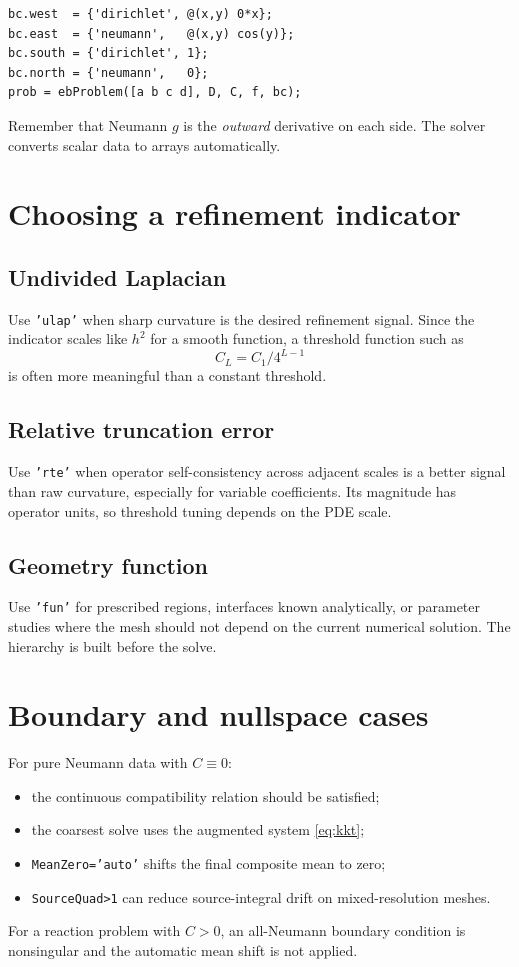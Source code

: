 \documentclass[11pt,oneside,openany]{book}
\newcommand{\code}[1]{\textnormal{\texttt{#1}}}
\begin{document}
\begin{lstlisting}[caption={Mixed physical boundary data.}]
bc.west  = {'dirichlet', @(x,y) 0*x};
bc.east  = {'neumann',   @(x,y) cos(y)};
bc.south = {'dirichlet', 1};
bc.north = {'neumann',   0};
prob = ebProblem([a b c d], D, C, f, bc);
\end{lstlisting}

Remember that Neumann $g$ is the \emph{outward} derivative on each side. The solver converts scalar data to arrays automatically.

\section{Choosing a refinement indicator}
\subsection{Undivided Laplacian}
Use \code{'ulap'} when sharp curvature is the desired refinement signal. Since the indicator scales like $h^2$ for a smooth function, a threshold function such as
\[
  C_L=C_1/4^{L-1}
\]
is often more meaningful than a constant threshold.

\subsection{Relative truncation error}
Use \code{'rte'} when operator self-consistency across adjacent scales is a better signal than raw curvature, especially for variable coefficients. Its magnitude has operator units, so threshold tuning depends on the PDE scale.

\subsection{Geometry function}
Use \code{'fun'} for prescribed regions, interfaces known analytically, or parameter studies where the mesh should not depend on the current numerical solution. The hierarchy is built before the solve.

\section{Boundary and nullspace cases}
For pure Neumann data with $C\equiv0$:
\begin{itemize}
\item the continuous compatibility relation should be satisfied;
\item the coarsest solve uses the augmented system \cref{eq:kkt};
\item \code{MeanZero='auto'} shifts the final composite mean to zero;
\item \code{SourceQuad>1} can reduce source-integral drift on mixed-resolution meshes.
\end{itemize}
For a reaction problem with $C>0$, an all-Neumann boundary condition is nonsingular and the automatic mean shift is not applied.
\end{document}
